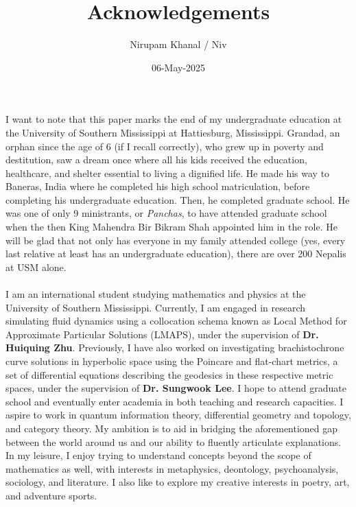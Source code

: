 \documentclass{article}
\begin{document}
\title{Acknowledgements}
\author{Nirupam Khanal / Niv}
\date{06-May-2025}

\maketitle

I want to note that this paper marks the end of my undergraduate education at the University of Southern Mississippi at Hattiesburg, Mississippi. Grandad, an orphan since the age of 6 (if I recall correctly), who grew up in poverty and destitution, saw a dream once where all his kids received the education, healthcare, and shelter essential to living a dignified life. He made his way to Baneras, India where he completed his high school matriculation, before completing his undergraduate education. Then, he completed graduate school. He was one of only 9 ministrants, or \textit{Panchas}, to have attended graduate school when the then King Mahendra Bir Bikram Shah appointed him in the role. He will be glad that not only has everyone in my family attended college (yes, every last relative at least has an undergraduate education), there are over 200 Nepalis at USM alone. \\ \\
I am an international student studying mathematics and physics at the University of Southern Mississippi. Currently, I am engaged in research simulating fluid dynamics using a collocation schema known as Local Method for Approximate Particular Solutions (LMAPS), under the supervision of \textbf{Dr. Huiquing Zhu}. Previously, I have also worked on investigating brachistochrone curve solutions in hyperbolic space using the Poincare and flat-chart metrics, a set of differential equations describing the geodesics in these respective metric spaces, under the supervision of \textbf{Dr. Sungwook Lee}. I hope to attend graduate school and eventually enter academia in both teaching and research capacities. I aspire to work in quantum information theory, differential geometry and topology, and category theory. My ambition is to aid in bridging the aforementioned gap between the world around us and our ability to fluently articulate explanations. In my leisure, I enjoy trying to understand concepts beyond the scope of mathematics as well, with interests in metaphysics, deontology, psychoanalysis, sociology, and literature. I also like to explore my creative interests in poetry, art, and adventure sports. \\ \\ 
\end{document}
